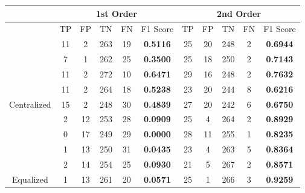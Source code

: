 \documentclass[10pt,a4paper]{article}
\begin{document}
		\begin{table}[!h]
			\centering
			\begin{tabular}{|c|c|c|c|c|c|c|c|c|c|c|}
				\hline
				& \multicolumn{5}{c|}{1st Order}                                                     & \multicolumn{5}{c|}{2nd Order}                              \\ \hline
				& TP & FP & TN  & FN                        & F1 Score                               & TP & FP & TN  & FN & F1 Score                               \\ \hline
				& 11 & 2  & 263 & {\color[HTML]{333333} 19} & {\color[HTML]{FE0000} \textbf{0.5116}} & 25 & 20 & 248 & 2  & {\color[HTML]{FE0000} \textbf{0.6944}} \\ \cline{2-11} 
				& 7  & 1  & 262 & {\color[HTML]{333333} 25} & {\color[HTML]{FE0000} \textbf{0.3500}} & 25 & 18 & 250 & 2  & {\color[HTML]{FE0000} \textbf{0.7143}} \\ \cline{2-11} 
				& 11 & 2  & 272 & {\color[HTML]{333333} 10} & {\color[HTML]{FE0000} \textbf{0.6471}} & 29 & 16 & 248 & 2  & {\color[HTML]{FE0000} \textbf{0.7632}} \\ \cline{2-11} 
				& 11 & 2  & 264 & {\color[HTML]{333333} 18} & {\color[HTML]{FE0000} \textbf{0.5238}} & 23 & 20 & 244 & 8  & {\color[HTML]{FE0000} \textbf{0.6216}} \\ \cline{2-11} 
				\multirow{-5}{*}{Centralized} & 15 & 2  & 248 & {\color[HTML]{333333} 30} & {\color[HTML]{FE0000} \textbf{0.4839}} & 27 & 20 & 242 & 6  & {\color[HTML]{FE0000} \textbf{0.6750}} \\ \hline
				& 2  & 12 & 253 & {\color[HTML]{333333} 28} & {\color[HTML]{FE0000} \textbf{0.0909}} & 25 & 4  & 264 & 2  & {\color[HTML]{FE0000} \textbf{0.8929}} \\ \cline{2-11} 
				& 0  & 17 & 249 & {\color[HTML]{333333} 29} & {\color[HTML]{FE0000} \textbf{0.0000}} & 28 & 11 & 255 & 1  & {\color[HTML]{FE0000} \textbf{0.8235}} \\ \cline{2-11} 
				& 1  & 13 & 250 & {\color[HTML]{333333} 31} & {\color[HTML]{FE0000} \textbf{0.0435}} & 23 & 4  & 263 & 5  & {\color[HTML]{FE0000} \textbf{0.8364}} \\ \cline{2-11} 
				& 2  & 14 & 254 & {\color[HTML]{333333} 25} & {\color[HTML]{FE0000} \textbf{0.0930}} & 21 & 5  & 267 & 2  & {\color[HTML]{FE0000} \textbf{0.8571}} \\ \cline{2-11} 
				\multirow{-5}{*}{Equalized}   & 1  & 13 & 261 & {\color[HTML]{333333} 20} & {\color[HTML]{FE0000} \textbf{0.0571}} & 25 & 1  & 266 & 3  & {\color[HTML]{FE0000} \textbf{0.9259}} \\ \hline
			\end{tabular}
		\end{table}
		
\end{document}
